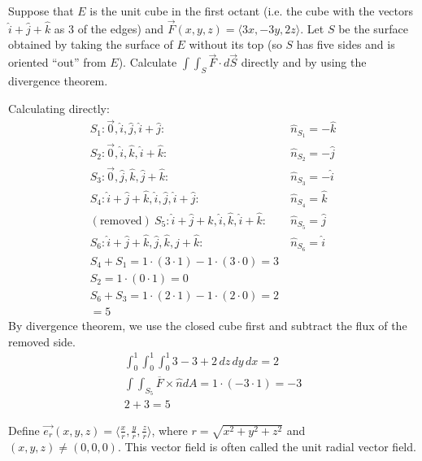 \documentclass[12pt]{exam}
\begin{document}
\begin{questions}
\question Suppose that $E$ is the unit cube in the first octant (i.e. the cube with the vectors $\hat{i} + \hat{j} + \hat{k}$ as 3 of the edges) and $\overrightarrow{F} (x, y, z) = \langle 3x, -3y, 2z\rangle$. Let $S$ be the surface obtained by taking the surface of $E$ without its top (so $S$ has five sides and is oriented “out” from $E$). Calculate $\int\int_S \overrightarrow{F} \cdot d \overrightarrow{S}$ directly and by using
the divergence theorem.
    \begin{solution}
        Calculating directly:
        \begin{align*}
            S_1: \overrightarrow{0}, \hat{i}, \hat{j}, \hat{i} + \hat{j}:&\ \hat{n}_{S_1} = -\hat{k} \\
            S_2: \overrightarrow{0}, \hat{i}, \hat{k}, \hat{i} + \hat{k}:&\ \hat{n}_{S_2} = -\hat{j} \\
            S_3: \overrightarrow{0}, \hat{j}, \hat{k}, \hat{j} + \hat{k}:&\ \hat{n}_{S_3} = -\hat{i} \\
            S_4: \hat{i} + \hat{j} + \hat{k}, \hat{i}, \hat{j}, \hat{i} + \hat{j}:&\ \hat{n}_{S_4} = \hat{k} \\
            (\text{removed})\ S_5: \hat{i} + \hat{j} + \hat{k}, \hat{i}, \hat{k}, \hat{i} + \hat{k}:&\ \hat{n}_{S_5} = \hat{j} \\
            S_6: \hat{i} + \hat{j} + \hat{k}, \hat{j}, \hat{k}, \hat{j} + \hat{k}:&\ \hat{n}_{S_6} = \hat{i} \\
            S_4 + S_1 = 1 \cdot (3 \cdot 1) - 1 \cdot (3 \cdot 0) = 3 \\
            S_2 = 1 \cdot (0 \cdot 1) = 0 \\
            S_6 + S_3 = 1 \cdot (2 \cdot 1) - 1 \cdot (2 \cdot 0) = 2 \\
            =\boxed{5}
        \end{align*}
        By divergence theorem, we use the closed cube first and subtract the flux of the removed side.
        \begin{align*}
            \int_{0}^{1}\int_{0}^{1}\int_{0}^{1} 3 - 3 + 2 \,dz\,dy\,dx = 2 \\
            \int\int_{S_5} \overline{F} \times \hat{n} dA = 1 \cdot (-3 \cdot 1) = -3\\
            2 + 3 = \boxed{5}
        \end{align*}
    \end{solution}

\question Define $ \overrightarrow{e_r}(x, y, z) = \langle \frac{x}{r}, \frac{y}{r}, \frac{z}{r} \rangle$, where $r = \sqrt{x^2 + y^2 + z^2}$ and $(x, y, z) \neq (0, 0, 0)$. This vector field is often called the unit radial vector field.
    \begin{parts}

\end{parts}
\end{questions}
\end{document}
